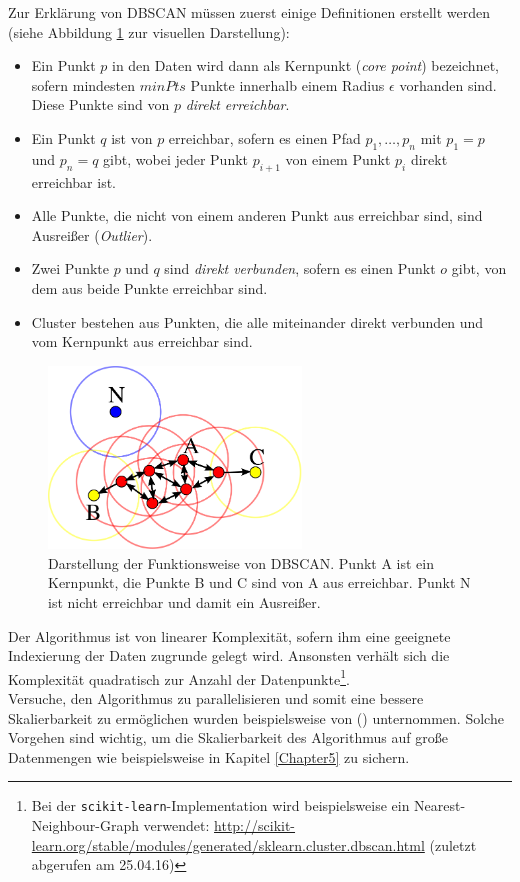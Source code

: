 Zur Erklärung von DBSCAN müssen zuerst einige Definitionen erstellt werden (siehe Abbildung \ref{fig:dbscan} zur visuellen
Darstellung):
\begin{itemize}
  \item Ein Punkt $p$ in den Daten wird dann als
  Kernpunkt (\emph{core point}) bezeichnet, sofern mindesten $minPts$ Punkte innerhalb einem Radius $\epsilon$ vorhanden sind.\\
  Diese Punkte sind von $p$ \emph{direkt erreichbar}.
  \item Ein Punkt $q$ ist von $p$ erreichbar, sofern es einen Pfad $p_1, \ldots, p_n$ mit $p_1 = p$ und $p_n = q$ gibt, wobei
  jeder Punkt $p_{i+1}$ von einem Punkt $p_i$ direkt erreichbar ist.
  \item Alle Punkte, die nicht von einem anderen Punkt aus erreichbar sind, sind Ausreißer (\emph{Outlier}).
  \item Zwei Punkte $p$ und $q$ sind \emph{direkt verbunden}, sofern es einen Punkt $o$ gibt,
  von dem aus beide Punkte erreichbar sind.
  \item Cluster bestehen aus Punkten, die alle miteinander direkt verbunden und vom Kernpunkt aus erreichbar sind.
\end{itemize}

\begin{figure}[h]
  \centering
  \includegraphics[width=0.6\textwidth]{../img/DBSCAN-Illustration.png}
  \caption[Darstellung der Funktionsweise von DBSCAN]{Darstellung der Funktionsweise von DBSCAN. Punkt A ist ein Kernpunkt, die
  Punkte B und C sind von A aus erreichbar. Punkt N ist nicht erreichbar und damit ein Ausreißer.\label{fig:dbscan}\footnotemark}
\end{figure}

Der Algorithmus ist von linearer Komplexität, sofern ihm eine geeignete Indexierung der Daten zugrunde gelegt wird. Ansonsten
verhält sich die Komplexität quadratisch zur Anzahl der Datenpunkte\footnote{Bei der
\verb|scikit-learn|-Implementation wird beispielsweise ein Nearest-Neighbour-Graph verwendet:
\url{http://scikit-learn.org/stable/modules/generated/sklearn.cluster.dbscan.html} (zuletzt abgerufen am 25.04.16)}.\\

Versuche, den Algorithmus zu parallelisieren und somit eine bessere Skalierbarkeit zu ermöglichen wurden beispielsweise von
(\cite{arlia2001experiments}) unternommen. Solche Vorgehen sind wichtig, um die Skalierbarkeit des Algorithmus auf große
Datenmengen wie beispielsweise in Kapitel \ref{Chapter5} zu sichern.
